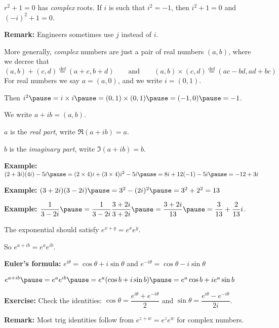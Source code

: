 \documentclass[10pt,aspectratio=169]{beamer}
\begin{document}
\begin{frame}
$r^2+1=0$ has \emph{complex} roots.  If $i$ is such that
$i^2=-1$, then $i^2+1=0$ and $(-i)^2+1 = 0$.

\pause
\medskip

\textbf{Remark:} Engineers sometimes use $j$ instead of $i$.

\medskip
\pause

More generally, \emph{complex} numbers are just a pair of real numbers
$(a,b)$, where we decree that
\[
(a,b)+(c,d)\overset{\text{def}}{=}(a+c,b+d) \qquad  \text{and} \qquad
(a,b) \times (c,d) \overset{\text{def}}{=} (ac-bd,ad+bc)
\]
\pause
For real numbers we say $a = (a,0)$, and we write $i=(0,1)$.

\medskip
\pause

Then $i^2 \pause = i \times i \pause = (0,1) \times (0,1) \pause = (-1,0)
\pause = -1$.

\medskip
\pause

We write $a+ib = (a,b)$.

\pause
$a$ is the \emph{real part}, write $\Re (a+ib) = a$.

\pause
$b$ is the \emph{imaginary part}, write $\Im (a+ib) = b$.

\medskip
\pause

\textbf{Example:}
\quad
$(2+3i)(4i) - 5i
\pause
=
(2\times 4)i + (3 \times 4) i^2 - 5i
\pause
=
8i + 12 (-1) - 5i
\pause
=
-12 + 3i$

\medskip
\pause

\textbf{Example:}
\quad
$(3+2i)(3-2i)
\pause
= 3^2-(2i)^2
\pause
= 3^2+2^2
=13$

\medskip
\pause

\textbf{Example:}
\quad
$\displaystyle \frac{1}{3-2i}
\pause
= \frac{1}{3-2i} \frac{3+2i}{3+2i}
\pause
= \frac{3+2i}{13}
\pause
= \frac{3}{13}+\frac{2}{13}i$.
\end{frame}

\begin{frame}
The exponential should satisfy $e^{x+y} = e^xe^y$.

\medskip
\pause

So $e^{a+ib} = e^a e^{ib}$.

\medskip
\pause

\textbf{Euler's formula:}
\quad
$e^{i \theta} = \cos \theta + i \sin \theta$
\quad and \quad
$e^{- i \theta} = \cos \theta - i \sin \theta$

\medskip
\pause

\thus\quad
$e^{a+ib} 
\pause
= e^a e^{ib}
\pause
=
e^a (\cos b + i \sin b)
\pause
=
e^a \cos b + i e^a \sin b$

\medskip
\pause

\textbf{Exercise:}
Check the identities:
\quad
$\cos \theta = \dfrac{e^{i \theta} + e^{-i \theta}}{2}$
\quad and \quad
$\sin \theta = \dfrac{e^{i \theta} - e^{-i \theta}}{2i}$.

\medskip
\pause

\textbf{Remark:} Most trig identities follow from $e^{z+w} = e^ze^w$ for
complex numbers.

\end{frame}
\end{document}
